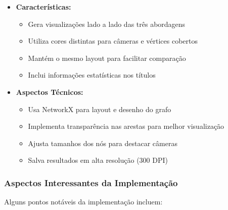 \documentclass[12pt, a4paper]{report}
\begin{document}
\begin{itemize}
    \item \textbf{Características:}
    \begin{itemize}
        \item Gera visualizações lado a lado das três abordagens
        \item Utiliza cores distintas para câmeras e vértices cobertos
        \item Mantém o mesmo layout para facilitar comparação
        \item Inclui informações estatísticas nos títulos
    \end{itemize}
    
    \item \textbf{Aspectos Técnicos:}
    \begin{itemize}
        \item Usa NetworkX para layout e desenho do grafo
        \item Implementa transparência nas arestas para melhor visualização
        \item Ajusta tamanhos dos nós para destacar câmeras
        \item Salva resultados em alta resolução (300 DPI)
    \end{itemize}
\end{itemize}

\subsubsection{Aspectos Interessantes da Implementação}
Alguns pontos notáveis da implementação incluem:
\end{document}
